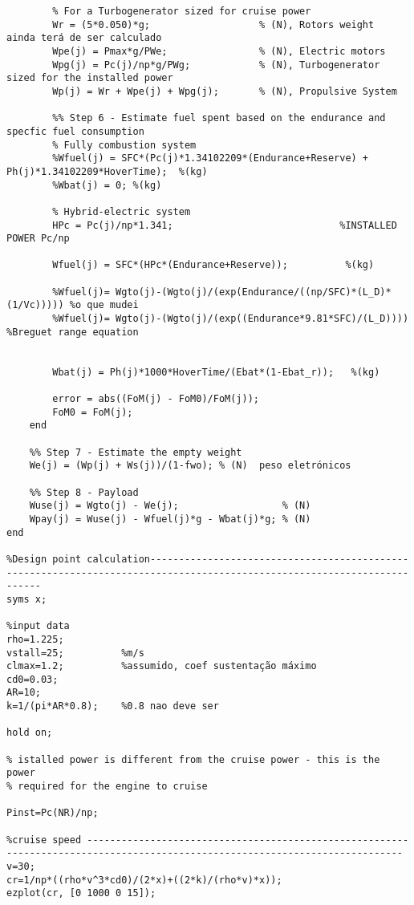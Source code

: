 \begin{verbatim}
        % For a Turbogenerator sized for cruise power
        Wr = (5*0.050)*g;                   % (N), Rotors weight  ainda terá de ser calculado
        Wpe(j) = Pmax*g/PWe;                % (N), Electric motors
        Wpg(j) = Pc(j)/np*g/PWg;            % (N), Turbogenerator sized for the installed power
        Wp(j) = Wr + Wpe(j) + Wpg(j);       % (N), Propulsive System

        %% Step 6 - Estimate fuel spent based on the endurance and specfic fuel consumption
        % Fully combustion system
        %Wfuel(j) = SFC*(Pc(j)*1.34102209*(Endurance+Reserve) + Ph(j)*1.34102209*HoverTime);  %(kg)
        %Wbat(j) = 0; %(kg)

        % Hybrid-electric system
        HPc = Pc(j)/np*1.341;                             %INSTALLED POWER Pc/np

        Wfuel(j) = SFC*(HPc*(Endurance+Reserve));          %(kg)

        %Wfuel(j)= Wgto(j)-(Wgto(j)/(exp(Endurance/((np/SFC)*(L_D)*(1/Vc))))) %o que mudei
        %Wfuel(j)= Wgto(j)-(Wgto(j)/(exp((Endurance*9.81*SFC)/(L_D)))) %Breguet range equation


        Wbat(j) = Ph(j)*1000*HoverTime/(Ebat*(1-Ebat_r));	%(kg)

        error = abs((FoM(j) - FoM0)/FoM(j));
        FoM0 = FoM(j);
    end

    %% Step 7 - Estimate the empty weight
    We(j) = (Wp(j) + Ws(j))/(1-fwo); % (N)  peso eletrónicos

    %% Step 8 - Payload
    Wuse(j) = Wgto(j) - We(j);                  % (N)
    Wpay(j) = Wuse(j) - Wfuel(j)*g - Wbat(j)*g; % (N)
end

%Design point calculation-------------------------------------------------------------------------------------------------------------------------
syms x;

%input data
rho=1.225;
vstall=25;          %m/s
clmax=1.2;          %assumido, coef sustentação máximo
cd0=0.03;
AR=10;
k=1/(pi*AR*0.8);    %0.8 nao deve ser

hold on;

% istalled power is different from the cruise power - this is the power
% required for the engine to cruise

Pinst=Pc(NR)/np;

%cruise speed -----------------------------------------------------------------------------------------------------------------------------
v=30;
cr=1/np*((rho*v^3*cd0)/(2*x)+((2*k)/(rho*v)*x));
ezplot(cr, [0 1000 0 15]);


\end{verbatim}
